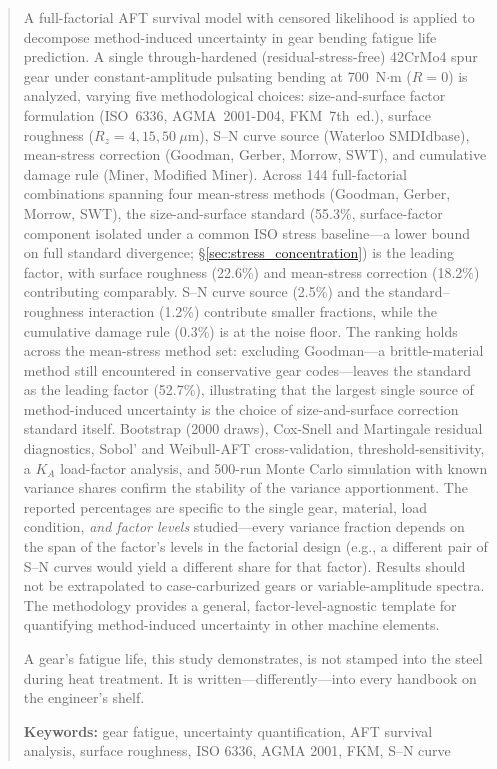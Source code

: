 \documentclass[twocolumn,12pt,a4paper]{article}
\begin{document}
\begin{abstract}
\label{sec:abstract}

A full-factorial AFT survival model with censored likelihood is
applied to decompose method-induced uncertainty in gear bending fatigue
life prediction. A single through-hardened (residual-stress-free)
42CrMo4 spur gear under constant-amplitude pulsating bending at
700~N$\cdot$m ($R=0$) is analyzed, varying five methodological choices:
size-and-surface factor formulation (ISO~6336, AGMA~2001-D04,
FKM~7th~ed.), surface roughness ($R_z=4,15,50~\mu$m), S--N curve
source (Waterloo SMDIdbase), mean-stress correction (Goodman, Gerber,
Morrow, SWT), and cumulative damage rule (Miner, Modified Miner).
Across 144 full-factorial combinations spanning four mean-stress
methods (Goodman, Gerber, Morrow, SWT), the size-and-surface standard
(55.3\%, surface-factor component isolated under a common ISO stress %
baseline---a lower bound on full standard divergence;
\S\ref{sec:stress_concentration}) is the leading factor, with
surface roughness (22.6\%) and mean-stress correction (18.2\%) %
contributing comparably. S--N curve source (2.5\%) and the %
standard--roughness interaction (1.2\%) contribute smaller fractions, %
while the cumulative damage rule (0.3\%) is at the noise floor. The %
ranking holds across the mean-stress method
set: excluding Goodman---a brittle-material method still encountered
in conservative gear codes---leaves the standard as the leading
factor (52.7\%), illustrating that the largest single source of
method-induced uncertainty is the choice of size-and-surface
correction standard itself. Bootstrap (2000 draws), Cox-Snell and Martingale
residual diagnostics, Sobol' and Weibull-AFT cross-validation,
threshold-sensitivity, a $K_A$ load-factor analysis, and 500-run %
Monte Carlo simulation with known variance shares confirm
the stability of the variance apportionment.
The reported percentages are specific to the single gear, material, load
condition, \emph{and factor levels} studied---every variance fraction
depends on the span of the factor's levels in the factorial design
(e.g., a different pair of S--N curves would yield a different share
for that factor). Results should not be extrapolated to case-carburized
gears or variable-amplitude spectra. The methodology provides a
general, factor-level-agnostic template for quantifying
method-induced uncertainty in other machine elements.

A gear's fatigue life, this study demonstrates, is not stamped into
the steel during heat treatment. It is written---differently---into
every handbook on the engineer's shelf.

\textbf{Keywords:} gear fatigue, uncertainty quantification, AFT survival analysis,
surface roughness, ISO 6336, AGMA 2001, FKM, S--N curve
\end{abstract}
\end{document}
